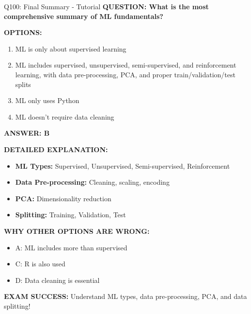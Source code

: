 \documentclass[8pt]{beamer}
\begin{document}
	\begin{frame}{Q100: Final Summary - Tutorial}
		\fontsize{6.5}{7.5}\selectfont
		\textbf{QUESTION: What is the most comprehensive summary of ML fundamentals?}
		
		\vspace{0.1cm}
		\textbf{OPTIONS:}
		\begin{enumerate}
			\item ML is only about supervised learning
			\item ML includes supervised, unsupervised, semi-supervised, and reinforcement learning, with data pre-processing, PCA, and proper train/validation/test splits
			\item ML only uses Python
			\item ML doesn't require data cleaning
		\end{enumerate}
		
		\vspace{0.1cm}
		\textcolor{myblue}{\textbf{ANSWER: B}}
		
		\vspace{0.1cm}
		\textbf{DETAILED EXPLANATION:}
		\begin{itemize}
			\item \textbf{ML Types:} Supervised, Unsupervised, Semi-supervised, Reinforcement
			\item \textbf{Data Pre-processing:} Cleaning, scaling, encoding
			\item \textbf{PCA:} Dimensionality reduction
			\item \textbf{Splitting:} Training, Validation, Test
		\end{itemize}
		
		\vspace{0.1cm}
		\textcolor{myred}{\textbf{WHY OTHER OPTIONS ARE WRONG:}}
		\begin{itemize}
			\item \textcolor{myred}{A:} ML includes more than supervised
			\item \textcolor{myred}{C:} R is also used
			\item \textcolor{myred}{D:} Data cleaning is essential
		\end{itemize}
		
		\textcolor{myred}{\textbf{EXAM SUCCESS:}} Understand \textcolor{myblue}{ML types, data pre-processing, PCA, and data splitting}!
	\end{frame}
	
\end{document}
